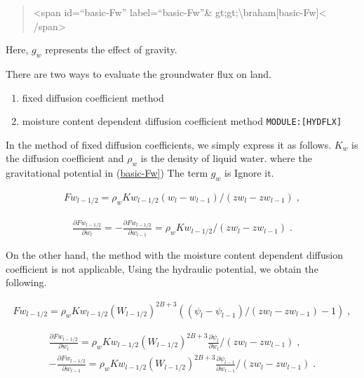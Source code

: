 \begin{quote}
\textless span id=``basic-Fw'' label=``basic-Fw''\&
gt;gt;\textbackslash braham{[}basic-Fw{]}\textless{} /span\textgreater{}
\end{quote}

Here, \(g_w\) represents the effect of gravity.

There are two ways to evaluate the groundwater flux on land.

\begin{enumerate}
\def\labelenumi{\arabic{enumi}.}
\item
  fixed diffusion coefficient method
\item
  moisture content dependent diffusion coefficient method
  \texttt{MODULE:{[}HYDFLX{]}}
\end{enumerate}

In the method of fixed diffusion coefficients, we simply express it as
follows. \(K_w\) is the diffusion coefficient and \(\rho_w\) is the
density of liquid water. where the gravitational potential in
(\protect\hyperlink{basic-Fw}{basic-Fw{]}}) The term \(g_w\) is Ignore
it.

\begin{eqnarray}
  Fw_{l-1/2} = \rho_w Kw_{l-1/2} (w_l - w_{l-1})/(zw_l - zw_{l-1}) \; ,
\end{eqnarray}

\begin{eqnarray}
  \frac{\partial Fw_{l-1/2}}{\partial w_l} = - \frac{\partial Fw_{l-1/2}}{\partial w_{l-1}}
 = \rho_w Kw_{l-1/2}/(zw_l - zw_{l-1}) \; .
\end{eqnarray}

On the other hand, the method with the moisture content dependent
diffusion coefficient is not applicable, Using the hydraulic potential,
we obtain the following.

\begin{eqnarray}
  Fw_{l-1/2} = \rho_w Kw_{l-1/2} (W_{l-1/2})^{2B+3} 
             ( (\psi_{l} - \psi_{l-1})/(zw_{l} - zw_{l-1}) -1 ) \; ,
\end{eqnarray}

\begin{eqnarray}
  \frac{\partial Fw_{l-1/2}}{\partial w_l} = \rho_w Kw_{l-1/2} (W_{l-1/2})^{2B+3} 
                     \frac{\partial \psi_{l}}{\partial w_l}/(zw_l - zw_{l-1}) \; ,\\
- \frac{\partial Fw_{l-1/2}}{\partial w_{l-1}} = \rho_w Kw_{l-1/2} (W_{l-1/2})^{2B+3} 
                     \frac{\partial \psi_{l-1}}{\partial w_{l-1}}/(zw_l - zw_{l-1}) \; .
\end{eqnarray}

